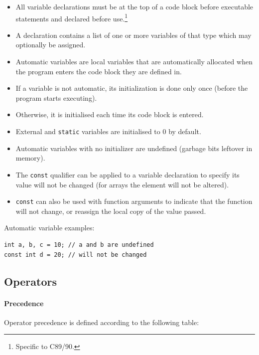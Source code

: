 \documentclass{article}
\newcommand{\code}[1]{\texttt{#1}}
\begin{document}
\begin{itemize}
    \item All variable declarations must be at the top of a code block before executable statements and declared before use.\footnote{Specific to C89/90.}
    \item A declaration contains a list of one or more variables of that type which may optionally be assigned.
    \item Automatic variables are local variables that are automatically allocated when the program enters the code block they are defined in.
    \item If a variable is not automatic, its initialization is done only once (before the program starts executing).
    \item Otherwise, it is initialised each time its code block is entered.
    \item External and \code{static} variables are initialised to 0 by default.
    \item Automatic variables with no initializer are undefined (garbage bits leftover in memory).
    \item The \code{const} qualifier can be applied to a variable declaration to specify its value will not be changed (for arrays the element will not be altered).
    \item \code{const} can also be used with function arguments to indicate that the function will not change, or reassign the local copy of the value passed.
\end{itemize}

Automatic variable examples:

\begin{lstlisting}
int a, b, c = 10; // a and b are undefined
const int d = 20; // will not be changed
\end{lstlisting}

\subsection{Operators}

\paragraph{Precedence} Operator precedence is defined according to the following table:
\end{document}
